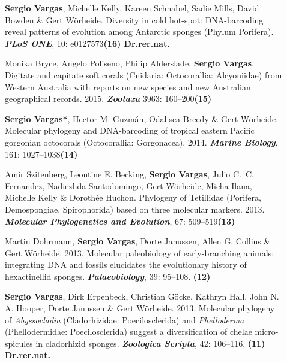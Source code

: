 \documentclass[letter,10pt]{article}
\begin{document}
\begin{description}
\item[]\textbf{Sergio Vargas}, Michelle Kelly, Kareen Schnabel, Sadie Mills, David Bowden \& Gert W\"orheide. Diversity in cold hot-spot: DNA-barcoding reveal patterns of evolution among Antarctic sponges (Phylum Porifera). \textbf{\emph{PLoS ONE}}, 10: e0127573\hfill\textbf{{\scriptsize (16) Dr.rer.nat.}}

\item[]Monika Bryce, Angelo Poliseno, Philip Alderslade, \textbf{Sergio Vargas}. Digitate and capitate soft corals (Cnidaria: Octocorallia: Alcyoniidae) from Western Australia with reports on new species and new Australian geographical records. 2015. \textbf{\emph{Zootaxa}} 3963: 160--200\hfill\textbf{{\scriptsize (15)}}

\item[]\textbf{Sergio Vargas*}, Hector M. Guzm\'an, Odalisca Breedy \& Gert W\"orheide. Molecular phylogeny and DNA-barcoding of tropical eastern Pacific gorgonian octocorals (Octocorallia: Gorgonacea). 2014. \textbf{\emph{Marine Biology}}, 161: 1027--1038\hfill\textbf{{\scriptsize (14)}}

\item[]Amir Szitenberg, Leontine E. Becking, \textbf{Sergio Vargas}, Julio C.~C. Fernandez, Nadiezhda Santodomingo, Gert W\"orheide, Micha Ilana, Michelle Kelly \& Doroth\'ee Huchon. Phylogeny of Tetillidae (Porifera, Demospongiae, Spirophorida) based on three molecular markers. 2013. \textbf{\emph{Molecular Phylogenetics and Evolution}}, 67: 509--519\hfill\textbf{{\scriptsize (13)}}

\item[]Martin Dohrmann, \textbf{Sergio Vargas}, Dorte Janussen, Allen G. Collins \& Gert W\"orheide. 2013. Molecular paleobiology of early-branching animals: integrating DNA and fossils elucidates the evolutionary history of hexactinellid sponges. \textbf{\emph{Palaeobiology}}, 39: 95--108. \hfill\textbf{{\scriptsize (12)}}

\item[]\textbf{Sergio Vargas}, Dirk Erpenbeck, Christian G\"ocke, Kathryn Hall, John N. A. Hooper, Dorte Janussen \& Gert W\"orheide. 2013. Molecular phylogeny of \emph{Abyssocladia} (Cladorhizidae: Poecilosclerida) and \emph{Phelloderma} (Phellodermidae: Poecilosclerida) suggest a diversification of chelae micro-spicules in cladorhizid sponges. \textbf{\emph{Zoologica Scripta}}, 42: 106--116. \hfill\textbf{{\scriptsize (11) Dr.rer.nat.}}


\end{description}
\end{document}
